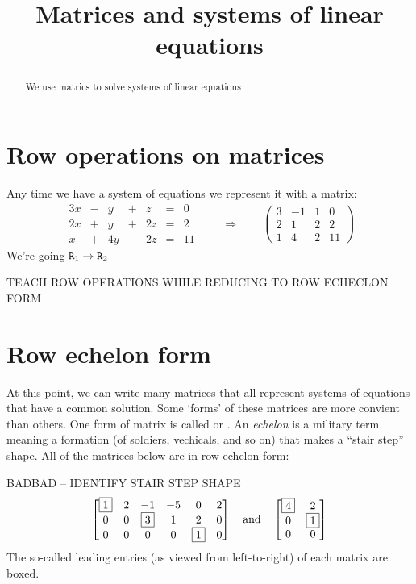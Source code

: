 \documentclass{ximera}
\title{Matrices and systems of linear equations}
\begin{document}
\begin{abstract}
  We use matrics to solve systems of linear equations
\end{abstract}
\maketitle

\section{Row operations on matrices}


Any time we have a system of equations we represent it with a matrix:
\[
\begin{array}{ccccccc}
      3x & -&y&+&z&= &0 \\
     2x& +&y&+&2z&=&2\\
     x& +&4y&-&2z&=&11
\end{array}
\qquad\Rightarrow\qquad
\left(\begin{array}{ccc|c}
  3 & -1 & 1 & 0 \\
  2 &  1 & 2 & 2 \\
  1 &  4 & 2 & 11 
\end{array}\right)
\]
We're going $\texttt{R}_1\to  \texttt{R}_2$

TEACH ROW OPERATIONS WHILE REDUCING TO ROW ECHECLON FORM



\section{Row echelon form}

At this point, we can write many matrices that all represent systems
of equations that have a common solution. Some `forms' of these
matrices are more convient than others. One form of matrix is called
 or . An \textit{echelon}
is a military term meaning a formation (of soldiers, vechicals, and so
on) that makes a ``stair step'' shape. All of the matrices below are
in row echelon form:
BADBAD -- IDENTIFY STAIR STEP SHAPE
\[
\begin{bmatrix}
 \fbox{1}&2&-1&-5&0&2\\0&0&\fbox{3}&1&2&0\\0&0&0&0&\fbox{1}&0
\end{bmatrix}
\quad
\text{and}
\quad\begin{bmatrix}
 \fbox{4}&2\\0&\fbox{1}\\0&0
\end{bmatrix}
\]
The so-called leading entries (as viewed from left-to-right) of each
matrix are boxed.
\end{document}
